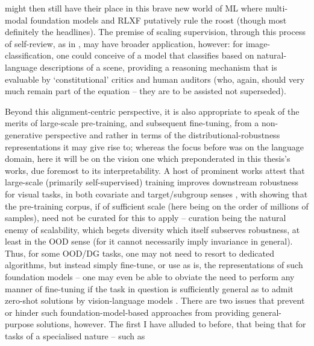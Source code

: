 might then still have their place in this brave new world of ML where multi-modal foundation models
\citep{driess2023palm, huang2023language, openai2023gpt4, katz2023gpt} and RLXF putatively rule the
roost (though most definitely the headlines).
%
The premise of scaling supervision, through this process of self-review, as in
\cite{bai2022constitutional}, may have broader application, however: for image-classification, one
could conceive of a model that classifies based on natural-language descriptions of a scene,
providing a reasoning mechanism that is evaluable by `constitutional' critics and human auditors
(who, again, should very much remain part of the equation -- they are to be assisted not
superseded).
%

%
Beyond this alignment-centric perspective, it is also appropriate to speak of the merits of
large-scale pre-training, and subsequent fine-tuning, from a non-generative perspective and rather
in terms of the distributional-robustness representations it may give rise to; whereas the focus
before was on the language domain, here it will be on the vision one which preponderated in this
thesis's works, due foremost to its interpretability.
%
A host of prominent works attest that large-scale (primarily self-supervised) training improves
downstream robustness for visual tasks, in both covariate \citep{hendrycks2019using,
hendrycks2020pretrained, radford2021learning} and target/subgroup senses \citep{liu2021self,
goyal2022vision}, with \cite{goyal2022vision} showing that the pre-training corpus, if of
sufficient scale (here being on the order of millions of samples), need not be curated for this to
apply -- curation being the natural enemy of scalability, which begets diversity which itself
subserves robustness, at least in the \ac{OOD} sense (for it cannot  necessarily imply invariance
in general).
%
Thus, for some \ac{OOD}/\ac{DG} tasks, one may not need to resort to dedicated algorithms, but
instead simply fine-tune, or use as is, the representations of such foundation models -- one may
even be able to obviate the need to perform any manner of fine-tuning if the task in question is
sufficiently general as to admit zero-shot solutions by vision-language models
\citep{radford2021learning, alayrac2022flamingo}.
%
There are two issues that prevent or hinder such foundation-model-based approaches from providing
general-purpose solutions, however. 
%
The first I have alluded to before, that being that for tasks of a specialised nature -- such as
